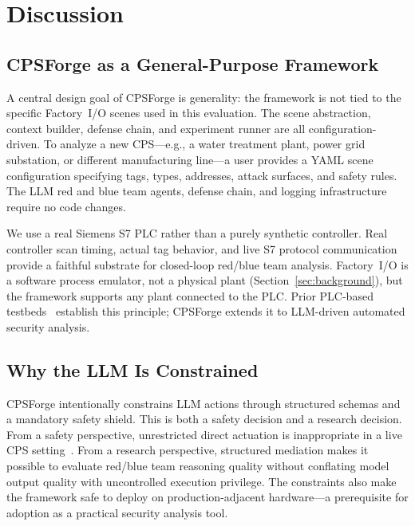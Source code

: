 \section{Discussion}
\label{sec:discussion}

\subsection{CPSForge as a General-Purpose Framework}

A central design goal of CPSForge is generality: the framework is not tied to the specific Factory~I/O scenes used in this evaluation. The scene abstraction, context builder, defense chain, and experiment runner are all configuration-driven. To analyze a new CPS---e.g., a water treatment plant, power grid substation, or different manufacturing line---a user provides a YAML scene configuration specifying tags, types, addresses, attack surfaces, and safety rules. The LLM red and blue team agents, defense chain, and logging infrastructure require no code changes.

We use a real Siemens S7 PLC rather than a purely synthetic controller. Real controller scan timing, actual tag behavior, and live S7 protocol communication provide a faithful substrate for closed-loop red/blue team analysis. Factory~I/O is a software process emulator, not a physical plant (Section~\ref{sec:background}), but the framework supports any plant connected to the PLC. Prior PLC-based testbeds~\cite{dehlaghi2023icssim, garcia2025sphere, pramadi2026simpleics} establish this principle; CPSForge extends it to LLM-driven automated security analysis.

\subsection{Why the LLM Is Constrained}

CPSForge intentionally constrains LLM actions through structured schemas and a mandatory safety shield. This is both a safety decision and a research decision. From a safety perspective, unrestricted direct actuation is inappropriate in a live CPS setting~\cite{lanotte2022runtime_ics, baird2024scalable_enforcement}. From a research perspective, structured mediation makes it possible to evaluate red/blue team reasoning quality without conflating model output quality with uncontrolled execution privilege. The constraints also make the framework safe to deploy on production-adjacent hardware---a prerequisite for adoption as a practical security analysis tool.


